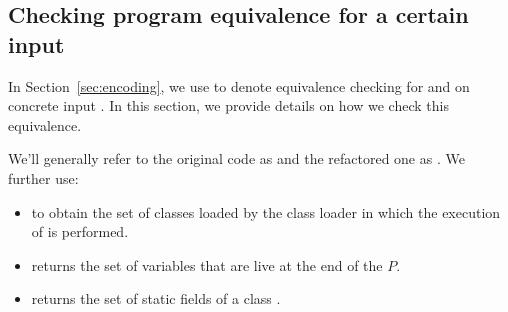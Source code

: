 \documentclass[runningheads,a4paper]{llncs}
\begin{document}

\subsection{Checking program equivalence for a certain input}\label{sec:equiv}


In Section~\ref{sec:encoding}, we use  to denote equivalence checking for  and
 on concrete input .
In this section, we provide details on how we check this equivalence.




We'll generally refer to the original code as  and the refactored one
as . We further use:
\begin{itemize}
\item {} to obtain the set of classes loaded by the class loader
  in which the execution of  is performed.
\item {} returns the set of variables that are live
at the end of the $P$. %
\item {} returns
  the set of static fields of a class .
\end{itemize}  
\end{document}
